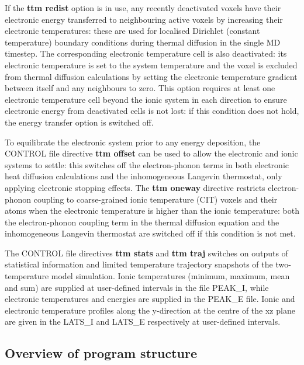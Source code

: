 If the {\bf ttm redist} option is in use, any recently deactivated voxels 
have their electronic energy transferred to neighbouring active voxels 
by increasing their electronic temperatures: these are used for localised 
Dirichlet (constant temperature) boundary conditions during thermal 
diffusion in the single MD timestep. The corresponding electronic 
temperature cell is also deactivated: its electronic temperature is set to 
the system temperature and the voxel is excluded from thermal diffusion 
calculations by setting the electronic temperature gradient between itself 
and any neighbours to zero. This option requires at least one electronic 
temperature cell beyond the ionic system in each direction to ensure 
electronic energy from deactivated cells is not lost: if this condition 
does not hold, the energy transfer option is switched off.

To equilibrate the electronic system prior to any energy deposition, 
the CONTROL file directive {\bf ttm offset} can be used to allow the 
electronic and ionic systems to settle: this switches off the 
electron-phonon terms in both electronic heat diffusion calculations 
and the inhomogeneous Langevin thermostat, only applying 
electronic stopping effects. The {\bf ttm oneway} directive restricts 
electron-phonon coupling to coarse-grained ionic temperature (CIT) 
voxels and their atoms when the electronic temperature is higher 
than the ionic temperature: both the electron-phonon coupling term 
in the thermal diffusion equation and the inhomogeneous Langevin 
thermostat are switched off if this condition is not met.

The CONTROL file directives {\bf ttm stats} and {\bf ttm traj} switches 
on outputs of statistical information and limited temperature trajectory 
snapshots of the two-temperature model simulation. Ionic 
temperatures (minimum, maximum, mean and sum) are supplied at 
user-defined intervals in the file PEAK\_I, while electronic temperatures 
and energies are supplied in the PEAK\_E file. Ionic and electronic 
temperature profiles along the y-direction at the centre of the xz plane 
are given in the LATS\_I and LATS\_E respectively at user-defined 
intervals.

\subsection*{Overview of program structure}

